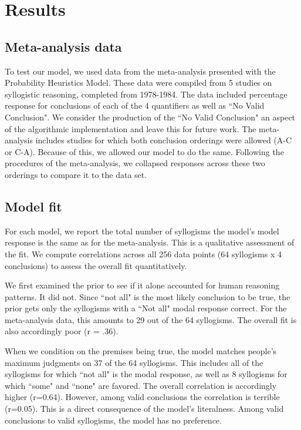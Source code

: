 \documentclass[10pt,letterpaper]{article}
\begin{document}
\section{Results}

\subsection{Meta-analysis data}
To test our model, we used data from the meta-analysis presented with the Probability Heuristics Model\cite{Chater1999}. These data were compiled from 5 studies on syllogistic reasoning, completed from 1978-1984. The data included percentage response for conclusions of each of the 4 quantifiers as well as ``No Valid Conclusion". We consider the production of the ``No Valid Conclusion" an aspect of the algorithmic implementation and leave this for future work. The meta-analysis includes studies for which both conclusion orderings were allowed (A-C or C-A). Because of this, we allowed our model to do the same. Following the procedures of the meta-analysis, we collapsed responses across these two orderings to compare it to the data set.

\subsection{Model fit}
For each model, we report the total number of syllogisms the model's model response is the same as for the meta-analysis. This is a qualitative assessment of the fit. We compute correlations across all 256 data points (64 syllogisms x 4 conclusions) to assess the overall fit quantitatively. 

We first examined the prior to see if it alone accounted for human reasoning patterns. It did not. Since ``not all" is the most likely conclusion to be true, the prior gets only the syllogisms with a ``Not all" modal response correct. For the meta-analysis data, this amounts to 29 out of the 64 syllogisms. The overall fit is also accordingly poor (r = .36). 

When we condition on the premises being true, the model matches people's maximum judgments on 37 of the 64 syllogisms. This includes all of the syllogisms for which ``not all" is the modal response, as well as 8 syllogisms for which ``some" and ``none" are favored. The overall correlation is accordingly higher (r=0.64). However, among valid conclusions the correlation is terrible (r=0.05). This is a direct consequence of the model's literalness. Among valid conclusions to valid syllogisms, the model has no preference.
\end{document}
